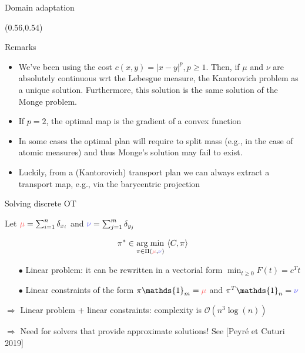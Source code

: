 \documentclass[pdf,aspectratio=169,10pt]{beamer}
\begin{document}
\begin{frame}{ Domain adaptation}
\begin{textblock}{0.45}(0.56,0.54)
\small
{}
\end{textblock}
\end{frame}







\begin{frame}{Remarks} 
    \begin{itemize}
        \item We've been using the cost $c(x,y) = |x-y|^p, p\geq 1$. Then, if $\mu$ and $\nu$ are absolutely continuous wrt the Lebesgue measure, the Kantorovich problem as a unique solution. Furthermore, this solution is the same solution of the Monge problem.
        \item If $p=2$, the optimal map is the gradient of a convex function
        \item In some cases the optimal plan will require to split mass (e.g., in the case of atomic measures) and thus Monge's solution may fail to exist. 
        \item Luckily, from a (Kantorovich) transport plan we can always extract a transport map, e.g., via the barycentric projection
    \end{itemize}
\end{frame}






\begin{frame}{Solving discrete OT}

Let $\er{\mu}=\sum_{i=1}^n\delta_{x_i}$ and $\eb{\nu}=\sum_{j=1}^m\delta_{y_j}$
\begin{block}{}
$$\pi^\ast \in \underset{\pi\in\Pi(\er{\mu},\eb{\nu})}{\argmin} \ \langle C, \pi \rangle$$
\end{block}

{\vspace{0.3cm}\begin{itemize}
\item[$\bullet$] Linear problem: it can be rewritten in a vectorial form $\min_{t\geq 0} F(t) = c^Tt$
\item[$\bullet$] Linear constraints of the form $\pi\mathds{1}_m =\er{\mu}$ and $\pi^T\mathds{1}_n=\eb{\nu}$
\end{itemize}
\vspace{0.1cm}$\Longrightarrow$ Linear problem + linear constraints: complexity is $\mathcal{O}(n^3\log(n))$}

{\vspace{0.3cm}$\Longrightarrow$ Need for solvers that provide approximate solutions! See [Peyré et Cuturi 2019]}
\end{frame}
\end{document}
